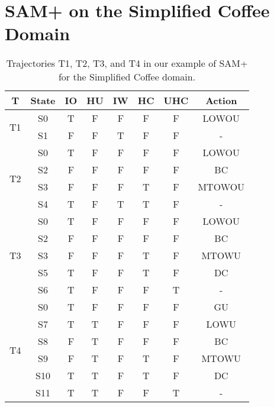 \documentclass[letterpaper]{article} %
\begin{document}
\section{SAM+ on the Simplified Coffee Domain}

\begin{table}[]
\begin{tabular}{@{}cccccccc@{}}
\toprule
T                   & State & IO & HU & IW & HC & UHC & Action \\ \midrule
\multirow{2}{*}{T1} & S0    & T  & F  & F  & F  & F   & LOWOU  \\
                    & S1    & F  & F  & T  & F  & F   &   -     \\ \midrule
\multirow{4}{*}{T2} & S0    & T  & F  & F  & F  & F   & LOWOU  \\
                    & S2    & F  & F  & F  & F  & F   & BC     \\
                    & S3    & F  & F  & F  & T  & F   & MTOWOU \\
                    & S4    & T  & F  & T  & T  & F   &   -     \\ \midrule
\multirow{5}{*}{T3} & S0    & T  & F  & F  & F  & F   & LOWOU  \\
                    & S2    & F  & F  & F  & F  & F   & BC     \\
                    & S3    & F  & F  & F  & T  & F   & MTOWU  \\
                    & S5    & T  & F  & F  & T  & F   & DC     \\
                    & S6    & T  & F  & F  & F  & T   &   -     \\ \midrule
\multirow{6}{*}{T4} & S0    & T  & F  & F  & F  & F   & GU     \\
                    & S7    & T  & T  & F  & F  & F   & LOWU   \\
                    & S8    & F  & T  & F  & F  & F   & BC     \\
                    & S9    & F  & T  & F  & T  & F   & MTOWU   \\
                    & S10   & T  & T  & F  & T  & F   & DC     \\
                    & S11   & T  & T  & F  & F  & T   &   -     \\ \bottomrule 
\end{tabular}

\caption{Trajectories T1, T2, T3, and T4 in our example of SAM+ for the Simplified Coffee domain.}\label{tab:trajectories-coffee}
\end{table}
\end{document}
